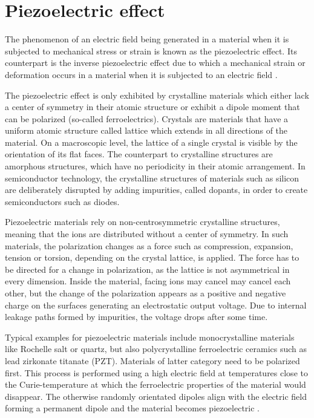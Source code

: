 \documentclass[
	english,
	ruledheaders=section, %
	class=report,%
	thesis={type=Project Seminar Report},%
	accentcolor=TUDa-1d, %
	custommargins=false,%
	marginpar=false,%
	parskip=half-,%
	fontsize=11pt,%
]{tudapub}
\begin{document}
\section{Piezoelectric effect}
The phenomenon of an electric field being generated in a material when it is subjected to mechanical stress or strain is known as the piezoelectric effect. Its counterpart is the inverse piezoelectric effect due to which a mechanical strain or deformation occurs in a material when it is subjected to an electric field \autocite{wangPiezoelectricPiezotronicEffects2013,arnauFundamentalsPiezoelectricity2008}.

The piezoelectric effect is only exhibited by crystalline materials which either lack a center of symmetry in their atomic structure or exhibit a dipole moment that can be polarized (so-called ferroelectrics). Crystals are materials that have a uniform atomic structure called lattice which extends in all directions of the material. On a macroscopic level, the lattice of a single crystal is visible by the orientation of its flat faces. The counterpart to crystalline structures are amorphous structures, which have no periodicity in their atomic arrangement.
In semiconductor technology, the crystalline structures of materials such as silicon are deliberately disrupted by adding impurities, called dopants, in order to create semiconductors such as diodes.

Piezoelectric materials rely on non-centrosymmetric crystalline structures, meaning that the ions are distributed without a center of symmetry. In such materials, the polarization changes as a force such as compression, expansion, tension or torsion, depending on the crystal lattice, is applied. The force has to be directed for a change in polarization, as the lattice is not asymmetrical in every dimension. Inside the material, facing ions may cancel may cancel each other, but the change of the polarization appears as a positive and negative charge on the surfaces generating an electrostatic output voltage. Due to internal leakage paths formed by impurities, the voltage drops after some time\autocite{arnauFundamentalsPiezoelectricity2008,grinerPiezoelectricMaterials2016}.

Typical examples for piezoelectric materials include monocrystalline materials like Rochelle salt or quartz, but also polycrystalline ferroelectric ceramics such as lead zirkonate titanate (PZT). Materials of latter category need to be polarized first. This process is performed using a high electric field at temperatures close to the Curie-temperature at which the ferroelectric properties of the material would disappear. The otherwise randomly orientated dipoles align with the electric field forming a permanent dipole and the material becomes piezoelectric \autocite{kimPiezoelectricEnergyHarvesting2009,grinerPiezoelectricMaterials2016}.
\end{document}
